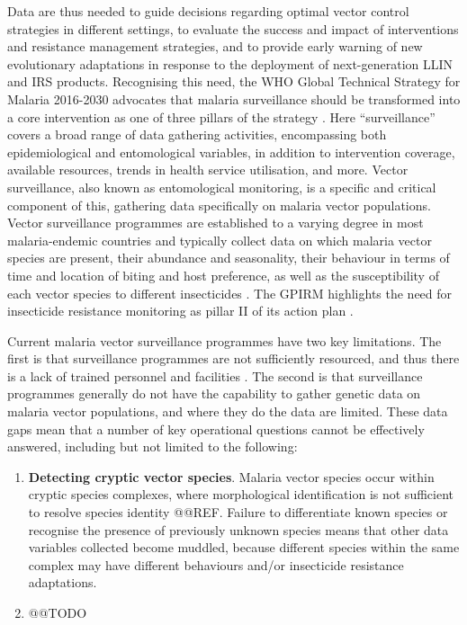 \documentclass[a4paper,11pt,abstracton,hidelinks]{scrartcl}
\begin{document}
Data are thus needed to guide decisions regarding optimal vector control strategies in different settings, to evaluate the success and impact of interventions and resistance management strategies, and to provide early warning of new evolutionary adaptations in response to the deployment of next-generation LLIN and IRS products.
%
Recognising this need, the WHO Global Technical Strategy for Malaria 2016-2030 advocates that malaria surveillance should be transformed into a core intervention as one of three pillars of the strategy \citep{WHO2015GTS}.
%
Here ``surveillance'' covers a broad range of data gathering activities, encompassing both epidemiological and entomological variables, in addition to intervention coverage, available resources, trends in health service utilisation, and more. 
%
Vector surveillance, also known as entomological monitoring, is a specific and critical component of this, gathering data specifically on malaria vector populations.
%
Vector surveillance programmes are established to a varying degree in most malaria-endemic countries and typically collect data on which malaria vector species are present, their abundance and seasonality, their behaviour in terms of time and location of biting and host preference, as well as the susceptibility of each vector species to different insecticides \citep{Russell2020}.
%
The GPIRM highlights the need for insecticide resistance monitoring as pillar \RN{2} of its action plan \citep{WHO2012GPIRM}.


Current malaria vector surveillance programmes have two key limitations.
%
The first is that surveillance programmes are not sufficiently resourced, and thus there is a lack of trained personnel and facilities \citep{Russell2020}.
%
The second is that surveillance programmes generally do not have the capability to gather genetic data on malaria vector populations, and where they do the data are limited.
%
These data gaps mean that a number of key operational questions cannot be effectively answered, including but not limited to the following:
\begin{enumerate}
%
\item \textbf{Detecting cryptic vector species}. Malaria vector species occur within cryptic species complexes, where morphological identification is not sufficient to resolve species identity @@REF. Failure to differentiate known species or recognise the presence of previously unknown species means that other data variables collected become muddled, because different species within the same complex may have different behaviours and/or insecticide resistance adaptations.
\item @@TODO
%
\end{enumerate} 
%

 


\printbibliography
\end{document}
